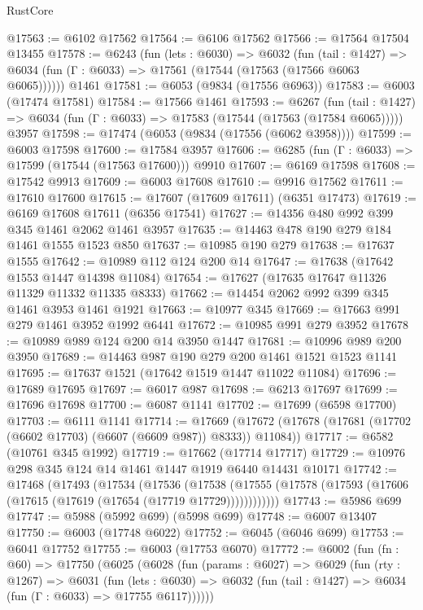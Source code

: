 \begin{lexlean}{RustCore}
\begin{coremodule}
@17563 := @6102 @17562
@17564 := @6106 @17562
@17566 := @17564 @17504 @13455
@17578 := @6243
    (fun (lets : @6030) =>
    @6032
      (fun (tail : @1427) =>
      @6034 (fun (Γ : @6033) => @17561 (@17544 (@17563 (@17566 @6063 @6065))))))
    @1461
@17581 := @6053 (@9834 (@17556 @6963))
@17583 := @6003 (@17474 @17581)
@17584 := @17566 @1461
@17593 := @6267
    (fun (tail : @1427) => @6034 (fun (Γ : @6033) => @17583 (@17544 (@17563 (@17584 @6065)))))
    @3957
@17598 := @17474 (@6053 (@9834 (@17556 (@6062 @3958))))
@17599 := @6003 @17598
@17600 := @17584 @3957
@17606 := @6285 (fun (Γ : @6033) => @17599 (@17544 (@17563 @17600))) @9910
@17607 := @6169 @17598
@17608 := @17542 @9913
@17609 := @6003 @17608
@17610 := @9916 @17562
@17611 := @17610 @17600
@17615 := @17607 (@17609 @17611) (@6351 @17473)
@17619 := @6169 @17608 @17611 (@6356 @17541)
@17627 := @14356 @480 @992 @399 @345 @1461 @2062 @1461 @3957
@17635 := @14463 @478 @190 @279 @184 @1461 @1555 @1523 @850
@17637 := @10985 @190 @279
@17638 := @17637 @1555
@17642 := @10989 @112 @124 @200 @14
@17647 := @17638 (@17642 @1553 @1447 @14398 @11084)
@17654 := @17627 (@17635 @17647 @11326 @11329 @11332 @11335 @8333)
@17662 := @14454 @2062 @992 @399 @345 @1461 @3953 @1461 @1921
@17663 := @10977 @345
@17669 := @17663 @991 @279 @1461 @3952 @1992 @6441
@17672 := @10985 @991 @279 @3952
@17678 := @10989 @989 @124 @200 @14 @3950 @1447
@17681 := @10996 @989 @200 @3950
@17689 := @14463 @987 @190 @279 @200 @1461 @1521 @1523 @1141
@17695 := @17637 @1521 (@17642 @1519 @1447 @11022 @11084)
@17696 := @17689 @17695
@17697 := @6017 @987
@17698 := @6213 @17697
@17699 := @17696 @17698
@17700 := @6087 @1141
@17702 := @17699 (@6598 @17700)
@17703 := @6111 @1141
@17714 := @17669
    (@17672 (@17678 (@17681 (@17702 (@6602 @17703) (@6607 (@6609 @987)) @8333)) @11084))
@17717 := @6582 (@10761 @345 @1992)
@17719 := @17662 (@17714 @17717)
@17729 := @10976 @298 @345 @124 @14 @1461 @1447 @1919 @6440 @14431 @10171
@17742 := @17468
    (@17493
      (@17534
        (@17536
          (@17538 (@17555 (@17578 (@17593 (@17606 (@17615 (@17619 (@17654 (@17719 @17729))))))))))))
@17743 := @5986 @699
@17747 := @5988 (@5992 @699) (@5998 @699)
@17748 := @6007 @13407
@17750 := @6003 (@17748 @6022)
@17752 := @6045 (@6046 @699)
@17753 := @6041 @17752
@17755 := @6003 (@17753 @6070)
@17772 := @6002
    (fun (fn : @60) =>
    @17750
      (@6025
        (@6028
          (fun (params : @6027) =>
          @6029
            (fun (rty : @1267) =>
            @6031
              (fun (lets : @6030) =>
              @6032 (fun (tail : @1427) => @6034 (fun (Γ : @6033) => @17755 @6117))))))

\end{coremodule}
\end{lexlean}
